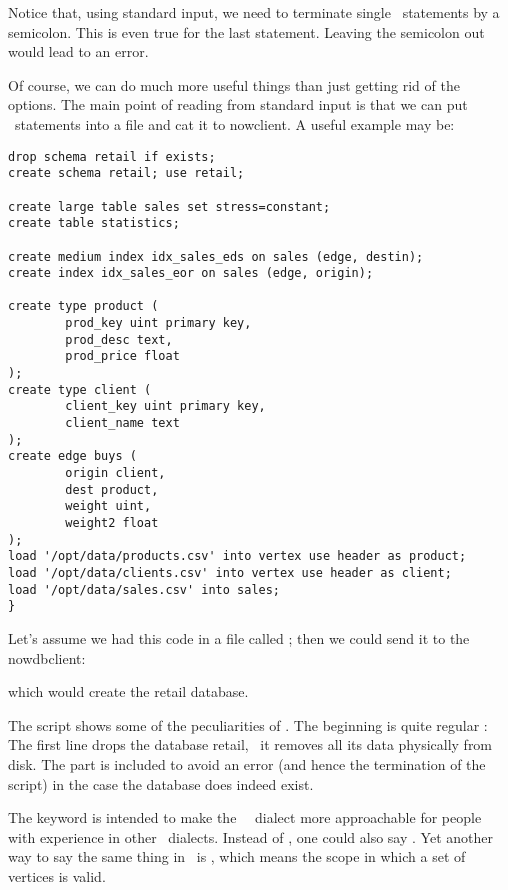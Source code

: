 
Notice that, using standard input,
we need to terminate single \sql\ statements
by a semicolon. This is even true for the last statement.
Leaving the semicolon out would lead to an error.

Of course, we can do much more useful things than just
getting rid of the options.
The main point of reading from standard input is
that we can put \sql\ statements into a file and
cat it to nowclient. A useful example may be:

\begingroup
\small
\begin{verbatim}
drop schema retail if exists;
create schema retail; use retail;

create large table sales set stress=constant;
create table statistics;

create medium index idx_sales_eds on sales (edge, destin);
create index idx_sales_eor on sales (edge, origin);

create type product (
        prod_key uint primary key,
        prod_desc text,
        prod_price float
);
create type client (
        client_key uint primary key,
        client_name text
);
create edge buys (
        origin client,
        dest product,
        weight uint,
        weight2 float
);
load '/opt/data/products.csv' into vertex use header as product;
load '/opt/data/clients.csv' into vertex use header as client;
load '/opt/data/sales.csv' into sales;
}
\end{verbatim}
\endgroup

Let's assume we had this code in a file called
; then we could
send it to the nowdbclient:


which would create the retail database.

The script shows some of the peculiarities of \nowdb.
The beginning is quite regular \sql:
The first line drops the database retail,
\ie\ it removes all its data physically
from disk. The  part
is included to avoid an error 
(and hence the termination of the script)
in the case
the database does indeed exist.

The keyword  is intended to 
make the \nowdb\ \sql\ dialect more
approachable for people with experience
in other \sql\ dialects. Instead of
, one could also say
. 
Yet another way to say the same thing
in \nowdb\ is , which
means the scope in which a set of
vertices is valid.

